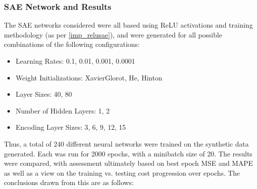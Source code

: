 \documentclass[a4paper,latin]{paper}
\begin{document}
\subsubsection{SAE Network and Results}\label{results_synthetic_sae}

The SAE networks considered were all based using ReLU activations and training methodology (as per \ref{imp_relusae}), and were generated for all possible combinations of the following configurations:

\begin{itemize}
	\item Learning Rates: 0.1, 0.01, 0.001, 0.0001	
	\item Weight Initializations: XavierGlorot, He, Hinton
	\item Layer Sizes: 40, 80
	\item Number of Hidden Layers: 1, 2
	\item Encoding Layer Sizes: 3, 6, 9, 12, 15
\end{itemize}

Thus, a total of 240 different neural networks were trained on the synthetic data generated. Each was run for 2000 epochs, with a minibatch size of 20. The results were compared, with assessment ultimately based on best epoch MSE and MAPE as well as a view on the training vs. testing cost progression over epochs. The conclusions drawn from this are as follows:
\end{document}
